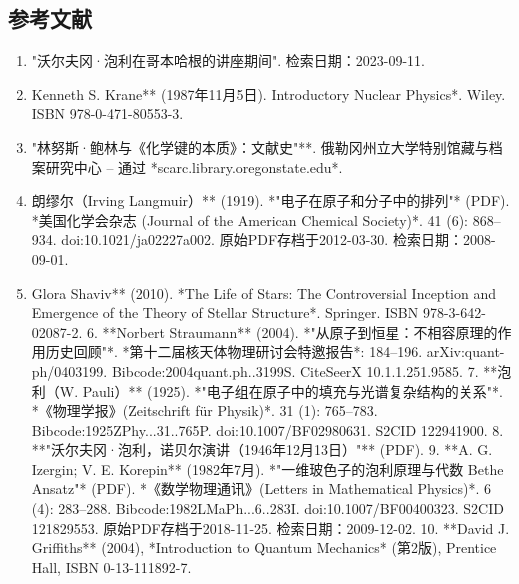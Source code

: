 \subsection{参考文献} 
\begin{enumerate}
\item "沃尔夫冈·泡利在哥本哈根的讲座期间". 检索日期：2023-09-11.  
\item Kenneth S. Krane** (1987年11月5日). Introductory Nuclear Physics*. Wiley. ISBN 978-0-471-80553-3.  
\item "林努斯·鲍林与《化学键的本质》：文献史"**. 俄勒冈州立大学特别馆藏与档案研究中心 – 通过 *scarc.library.oregonstate.edu*.  
\item 朗缪尔（Irving Langmuir）** (1919). *"电子在原子和分子中的排列"* (PDF). *美国化学会杂志 (Journal of the American Chemical Society)*. 41 (6): 868–934. doi:10.1021/ja02227a002. 原始PDF存档于2012-03-30. 检索日期：2008-09-01.  
\item Glora Shaviv** (2010). *The Life of Stars: The Controversial Inception and Emergence of the Theory of Stellar Structure*. Springer. ISBN 978-3-642-02087-2.  
6. **Norbert Straumann** (2004). *"从原子到恒星：不相容原理的作用历史回顾"*. *第十二届核天体物理研讨会特邀报告*: 184–196. arXiv:quant-ph/0403199. Bibcode:2004quant.ph..3199S. CiteSeerX 10.1.1.251.9585.  
7. **泡利（W. Pauli）** (1925). *"电子组在原子中的填充与光谱复杂结构的关系"*. *《物理学报》(Zeitschrift für Physik)*. 31 (1): 765–783. Bibcode:1925ZPhy...31..765P. doi:10.1007/BF02980631. S2CID 122941900.  
8. **"沃尔夫冈·泡利，诺贝尔演讲（1946年12月13日）"** (PDF).  
9. **A. G. Izergin; V. E. Korepin** (1982年7月). *"一维玻色子的泡利原理与代数 Bethe Ansatz"* (PDF). *《数学物理通讯》(Letters in Mathematical Physics)*. 6 (4): 283–288. Bibcode:1982LMaPh...6..283I. doi:10.1007/BF00400323. S2CID 121829553. 原始PDF存档于2018-11-25. 检索日期：2009-12-02.  
10. **David J. Griffiths** (2004), *Introduction to Quantum Mechanics* (第2版), Prentice Hall, ISBN 0-13-111892-7.
\end{enumerate}